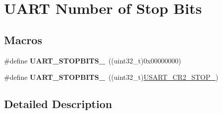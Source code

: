 \hypertarget{group___u_a_r_t___stop___bits}{\section{U\-A\-R\-T Number of Stop Bits}
\label{group___u_a_r_t___stop___bits}
}
\subsection*{Macros}
\begin{DoxyCompactItemize}
\item 
\hypertarget{group___u_a_r_t___stop___bits_ga7cf97e555292d574de8abc596ba0e2ce}{\#define {\bfseries U\-A\-R\-T\-\_\-\-S\-T\-O\-P\-B\-I\-T\-S\-\_}~((uint32\-\_\-t)0x00000000)}\label{group___u_a_r_t___stop___bits_ga7cf97e555292d574de8abc596ba0e2ce}

\item 
\hypertarget{group___u_a_r_t___stop___bits_ga91616523380f7450aac6cb7e17f0c0f2}{\#define {\bfseries U\-A\-R\-T\-\_\-\-S\-T\-O\-P\-B\-I\-T\-S\-\_}~((uint32\-\_\-t)\hyperlink{group___peripheral___registers___bits___definition_ga2b24d14f0e5d1c76c878b08aad44d02b}{U\-S\-A\-R\-T\-\_\-\-C\-R2\-\_\-\-S\-T\-O\-P\-\_})}\label{group___u_a_r_t___stop___bits_ga91616523380f7450aac6cb7e17f0c0f2}

\end{DoxyCompactItemize}


\subsection{Detailed Description}
